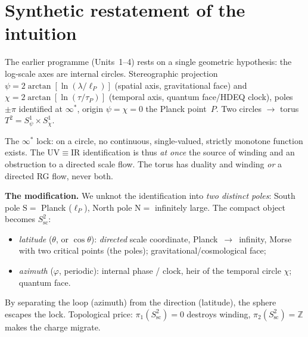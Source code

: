 \documentclass[11pt]{article}
\newcommand{\Spole}{\mathrm{S}}
\newcommand{\Npole}{\mathrm{N}}
\newcommand{\lP}{\ell_P}
\newcommand{\Stwo}{S^2_{\text{sc}}}
\theoremstyle{definition}
\begin{document}
\section{Synthetic restatement of the intuition}
The earlier programme (Units~1--4) rests on a single geometric hypothesis: the log-scale axes are
internal circles. Stereographic projection $\psi=2\arctan[\ln(\lambda/\lP)]$ (spatial axis, gravitational
face) and $\chi=2\arctan[\ln(\tau/\tau_P)]$ (temporal axis, quantum face/HDEQ clock), poles $\pm\pi$
identified at $\infty^\ast$, origin $\psi=\chi=0$ the Planck point~$P$. Two circles $\to$ torus
$T^2=S^1_\psi\times S^1_\chi$.

The $\infty^\ast$ lock: on a circle, no continuous, single-valued, strictly monotone function exists.
The UV$\equiv$IR identification is thus \emph{at once} the source of winding and an obstruction to a
directed scale flow. The torus has duality and winding \emph{or} a directed RG flow, never both.

\textbf{The modification.} We unknot the identification into \emph{two distinct poles}: South pole
$\Spole=$ Planck ($\lP$), North pole $\Npole=$ infinitely large. The compact object becomes $\Stwo$:
\begin{itemize}[nosep]
\item \emph{latitude} ($\theta$, or $\cos\theta$): \emph{directed} scale coordinate,
Planck~$\to$~infinity, Morse with two critical points (the poles); gravitational/cosmological face;
\item \emph{azimuth} ($\varphi$, periodic): internal phase / clock, heir of the temporal circle
$\chi$; quantum face.
\end{itemize}
By separating the loop (azimuth) from the direction (latitude), the sphere escapes the lock. Topological
price: $\pi_1(\Stwo)=0$ destroys winding, $\pi_2(\Stwo)=\mathbb{Z}$ makes the charge migrate.
\end{document}
